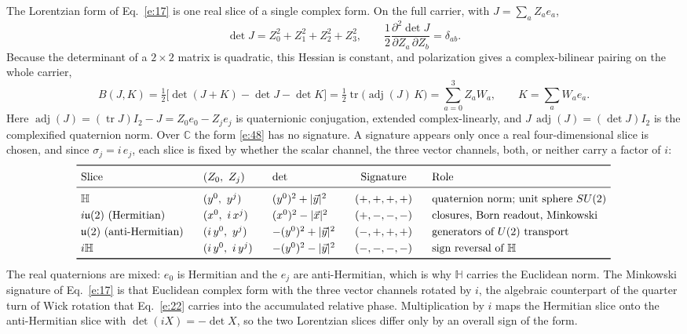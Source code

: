 \documentclass[10pt]{article}
\newcommand{\tr}{\operatorname{tr}}
\newcommand{\adj}{\operatorname{adj}}
\begin{document}
\smallskip
The Lorentzian form of Eq.~\eqref{e:17} is one real slice of a single complex form. On the full carrier, with $J=\sum_aZ_ae_a$,
\begin{equation}
\det J=Z_0^2+Z_1^2+Z_2^2+Z_3^2,\qquad \frac12\frac{\partial^2\det J}{\partial Z_a\,\partial Z_b}=\delta_{ab}.\label{e:48}
\end{equation}
Because the determinant of a $2\times2$ matrix is quadratic, this Hessian is constant, and polarization gives a complex-bilinear pairing on the whole carrier,
\begin{equation}
B(J,K)=\tfrac12\bigl[\det(J+K)-\det J-\det K\bigr]=\tfrac12\tr\bigl(\adj(J)\,K\bigr)=\sum_{a=0}^{3}Z_aW_a,\qquad K=\sum_aW_ae_a.\label{e:49}
\end{equation}
Here $\adj(J)=(\tr J)I_2-J=Z_0e_0-Z_je_j$ is quaternionic conjugation, extended complex-linearly, and $J\,\adj(J)=(\det J)I_2$ is the complexified quaternion norm. Over $\mathbb C$ the form \eqref{e:48} has no signature. A signature appears only once a real four-dimensional slice is chosen, and since $\sigma_j=i\,e_j$, each slice is fixed by whether the scalar channel, the three vector channels, both, or neither carry a factor of $i$:
\[
\renewcommand{\arraystretch}{1.25}
\setlength{\arraycolsep}{4pt}\begin{array}{l>{\quad}l>{\quad}l>{\quad}c>{\quad}l}
\toprule
\text{Slice} & (Z_0,\ Z_j) & \det & \text{Signature} & \text{Role}\\
\midrule
\mathbb H & (y^0,\ y^j) & (y^0)^2+|\vec y|^2 & (+,+,+,+) & \text{quaternion norm; unit sphere }SU(2)\\
i\mathfrak u(2)\ \text{(Hermitian)} & (x^0,\ i\,x^j) & (x^0)^2-|\vec x|^2 & (+,-,-,-) & \text{closures, Born readout, Minkowski}\\
\mathfrak u(2)\ \text{(anti-Hermitian)} & (i\,y^0,\ y^j) & -(y^0)^2+|\vec y|^2 & (-,+,+,+) & \text{generators of } U(2)\text{ transport}\\
i\mathbb H & (i\,y^0,\ i\,y^j) & -(y^0)^2-|\vec y|^2 & (-,-,-,-) & \text{sign reversal of }\mathbb H\\
\bottomrule
\end{array}
\]
The real quaternions are mixed: $e_0$ is Hermitian and the $e_j$ are anti-Hermitian, which is why $\mathbb H$ carries the Euclidean norm. The Minkowski signature of Eq.~\eqref{e:17} is that Euclidean complex form with the three vector channels rotated by $i$, the algebraic counterpart of the quarter turn of Wick rotation that Eq.~\eqref{e:22} carries into the accumulated relative phase. Multiplication by $i$ maps the Hermitian slice onto the anti-Hermitian slice with $\det(iX)=-\det X$, so the two Lorentzian slices differ only by an overall sign of the form.
\end{document}
